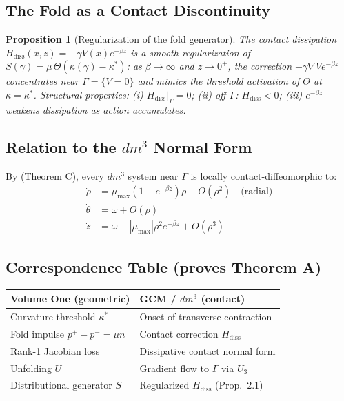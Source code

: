 \documentclass[11pt]{article}
\theoremstyle{boxed}
\newtheorem{proposition}[theorem]{Proposition}
\begin{document}
\subsection{The Fold as a Contact Discontinuity}

\begin{proposition}[Regularization of the fold generator]
The contact dissipation $H_{\mathrm{diss}}(x,z) = -\gamma V(x) e^{-\beta z}$ is a
smooth regularization of $S(\gamma) = \mu\, \Theta(\kappa(\gamma) - \kappa^{*})$:
as $\beta \to \infty$ and $z \to 0^{+}$, the correction $-\gamma \nabla V e^{-\beta z}$
concentrates near $\Gamma = \{V = 0\}$ and mimics the threshold activation of
$\Theta$ at $\kappa = \kappa^{*}$.
Structural properties: (i) $H_{\mathrm{diss}}|_{\Gamma} = 0$;
(ii) off $\Gamma$: $H_{\mathrm{diss}} < 0$;
(iii) $e^{-\beta z}$ weakens dissipation as action accumulates.
\end{proposition}

\subsection{Relation to the $dm^3$ Normal Form}

By \cite{GCM} (Theorem C), every $dm^3$ system near $\Gamma$ is locally
contact-diffeomorphic to:
\begin{align*}
\dot{\rho} &= \mu_{\max}(1 - e^{-\beta z})\rho + O(\rho^2) \quad\text{(radial)}\\
\dot{\theta} &= \omega + O(\rho)\\
\dot{z} &= \omega - |\mu_{\max}|\rho^2 e^{-\beta z} + O(\rho^3)
\end{align*}

\subsection{Correspondence Table (proves Theorem A)}

\begin{center}
\begin{tabular}{ll}
\toprule
\textbf{Volume One (geometric)} & \textbf{GCM / $dm^3$ (contact)}\\
\midrule
Curvature threshold $\kappa^{*}$ & Onset of transverse contraction\\
Fold impulse $p^{+} - p^{-} = \mu n$ & Contact correction $H_{\mathrm{diss}}$\\
Rank-1 Jacobian loss & Dissipative contact normal form\\
Unfolding $U$ & Gradient flow to $\Gamma$ via $U_3$ \cite{GCM}\\
Distributional generator $S$ & Regularized $H_{\mathrm{diss}}$ (Prop.~2.1)\\
\bottomrule
\end{tabular}
\end{center}
\end{document}

